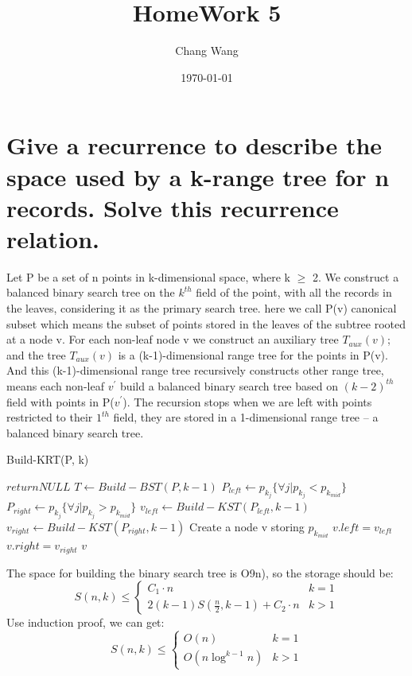 \documentclass{report}
\begin{document}
\title{HomeWork 5}
\author{Chang Wang}
\date{\today}
\maketitle
\section{Give a recurrence to describe the space used by a k-range tree for n records. Solve this recurrence relation.}

Let P be a set of n points in k-dimensional space, where k $\ge$ 2. We construct a balanced binary search tree on the $k^{th}$ field of the point, with all the records in the leaves, considering it as the primary search tree. here we call P(v) canonical subset which means the subset of points stored in the leaves of the subtree rooted at a node v. For each non-leaf node v we construct an auxiliary tree $T_{aux}(v)$; and the tree $T_{aux}(v)$ is a (k-1)-dimensional range tree for the points in P(v). And this (k-1)-dimensional range tree recursively constructs other range tree, means each non-leaf $v^{'}$ build a balanced binary search tree based on $(k-2)^{th}$ field with points in P($v^{'}$). The recursion stops when we are left with points restricted to their $1^{th}$ field, they are stored in a 1-dimensional range tree -- a balanced binary search tree. \\[0.5cm]
\begin{algorithm}
\caption{Build-KRT(P, k)}
\begin{algorithmic}

   \STATE $return NULL$
   \ENDIF
   \STATE $T \leftarrow Build-BST(P, k-1)$
   \STATE $P_{left} \leftarrow p_{k_{j}} \{ \forall j | p_{k_{j}} < p_{k_{mid}} \}$
   \STATE $P_{right} \leftarrow p_{k_{j}} \{ \forall j | p_{k_{j}} > p_{k_{mid}} \}$
   \STATE $v_{left} \leftarrow Build-KST(P_{left}, k-1)$
   \STATE $v_{right} \leftarrow Build-KST(P_{right}, k-1)$
   \ENDWHILE
   \STATE Create a node v storing $p_{k_{mid}}$
   \STATE $v.left = v_{left}$
   \STATE $v.right = v_{right}$
   \RETURN $v$
\end{algorithmic}
\end{algorithm}
The space for building the binary search tree is O9n), so the storage should be: \\
\[
S(n, k) \le \left\{\begin{array}{ll}
C_{1} \cdot n & k = 1 \\
2(k-1)S(\frac {n}{2}, k-1) + C_{2} \cdot n &  k > 1
\end{array} \right.
\]
Use induction proof, we can get:
\[
S(n, k) \le \left\{\begin{array}{ll}
O(n) & k = 1 \\
O(n\log^{k-1}n) &  k > 1
\end{array} \right.
\]
\end{document}
